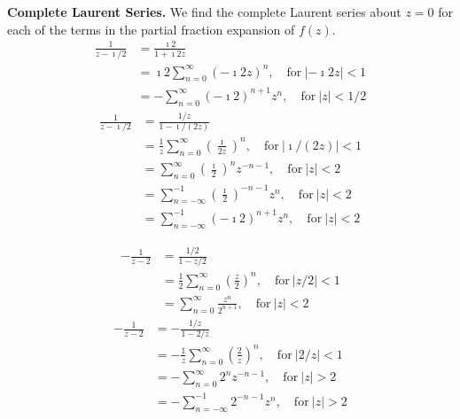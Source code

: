 {\begin{Solution}
  \textbf{Complete Laurent Series.}
  We find the complete Laurent series about $z = 0$ for each of the 
  terms in the partial fraction expansion of $f(z)$.
  \begin{align*}
    \frac{1}{z - \imath / 2}
    &= \frac{\imath 2}{1 + \imath 2 z} 
    \\
    &= \imath 2 \sum_{n = 0}^\infty (- \imath 2 z)^n, \quad \mathrm{for}\ |- \imath 2 z| < 1 
    \\
    &= - \sum_{n = 0}^\infty (- \imath 2)^{n+1} z^n, \quad \mathrm{for}\ |z| < 1/2 
  \end{align*}
  \begin{align*}
    \frac{1}{z - \imath / 2}
    &= \frac{1/z}{1 - \imath / (2 z)} 
    \\
    &= \frac{1}{z} \sum_{n = 0}^\infty \left( \frac{\imath}{2 z} \right)^n,
    \quad \mathrm{for}\ |\imath / (2 z)| < 1 
    \\
    &= \sum_{n = 0}^\infty \left( \frac{\imath}{2} \right)^n z^{-n - 1}, 
    \quad \mathrm{for}\ |z| < 2 
    \\
    &= \sum_{n = -\infty}^{-1} \left( \frac{\imath}{2} \right)^{-n-1} z^n, 
    \quad \mathrm{for}\ |z| < 2 
    \\
    &= \sum_{n = -\infty}^{-1} (- \imath 2)^{n+1} z^n, \quad \mathrm{for}\ |z| < 2 
  \end{align*}

  \begin{align*}
    - \frac{1}{z - 2}
    &= \frac{1/2}{1 - z/2} 
    \\
    &= \frac{1}{2} \sum_{n = 0}^\infty \left( \frac{z}{2} \right)^n, 
    \quad \mathrm{for}\ |z/2| < 1 
    \\
    &= \sum_{n = 0}^\infty \frac{z^n}{2^{n+1}},
    \quad \mathrm{for}\ |z| < 2 
  \end{align*}
  \begin{align*}
    - \frac{1}{z - 2}
    &= - \frac{ 1/z }{ 1 - 2/z } 
    \\
    &= - \frac{1}{z} \sum_{n = 0}^\infty \left( \frac{2}{z} \right)^n,
    \quad \mathrm{for}\ |2/z| < 1 
    \\
    &= - \sum_{n = 0}^\infty 2^n z^{-n - 1},
    \quad \mathrm{for}\ |z| > 2 
    \\
    &= - \sum_{n = -\infty}^{-1} 2^{-n - 1} z^n,
    \quad \mathrm{for}\ |z| > 2 
  \end{align*}


\end{Solution}}
